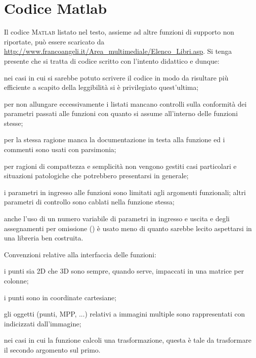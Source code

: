 


\chapter{Codice Matlab}


\vspace{-1.5cm}
Il codice \textsc{Matlab} listato nel testo, assieme ad altre funzioni
di supporto non riportate, può essere scaricato da
\url{http://www.francoangeli.it/Area_multimediale/Elenco_Libri.asp}.
Si tenga presente che si tratta di codice scritto con l'intento
didattico e dunque:

\begin{compactitem}
\item nei casi in cui si sarebbe potuto scrivere il codice in modo da
  risultare più efficiente a scapito della leggibilità si è
  privilegiato quest'ultima;
\item per non allungare eccessivamente i listati mancano controlli
  sulla conformità dei parametri passati alle funzioni con quanto si
  assume all'interno delle funzioni stesse;
\item per la stessa ragione manca la documentazione in testa alla
  funzione ed i commenti sono usati con parsimonia;
\item per ragioni di compattezza e semplicità non vengono gestiti
  casi particolari e situazioni patologiche che potrebbero
  presentarsi in generale;
\item i parametri in ingresso alle funzioni sono limitati agli
  argomenti funzionali; altri parametri di controllo sono cablati
  nella funzione stessa;
\item   anche l'uso di un numero variabile di
  parametri in ingresso e uscita e degli assegnamenti per omissione
  () è usato meno di quanto sarebbe lecito aspettarsi
  in una libreria ben costruita.
\end{compactitem}  

Convenzioni relative alla interfaccia delle funzioni:
\begin{compactitem}  
\item i punti sia 2D che 3D sono sempre, quando serve, impaccati in
  una matrice per colonne;
\item i punti sono in coordinate cartesiane; 
\item gli oggetti (punti, \ac{MPP}, ...) relativi a immagini multiple sono
  rappresentati con  indicizzati dall'immagine;
\item nei casi in cui la funzione calcoli una trasformazione, questa
  è tale da trasformare il secondo argomento sul primo.   
\end{compactitem}


